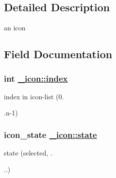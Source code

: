\subsection{Detailed Description}
an icon 



\subsection{Field Documentation}
\hypertarget{struct__icon_o7}{
\subsubsection[index]{\setlength{\rightskip}{0pt plus 5cm}int \hyperlink{struct__icon_o7}{\_\-icon::index}}}
\label{struct__icon_o7}


index in icon-list (0. 

.n-1) \hypertarget{struct__icon_o8}{
\subsubsection[state]{\setlength{\rightskip}{0pt plus 5cm}icon\_\-state \hyperlink{struct__icon_o8}{\_\-icon::state}}}
\label{struct__icon_o8}


state (selected, . 

..) 
